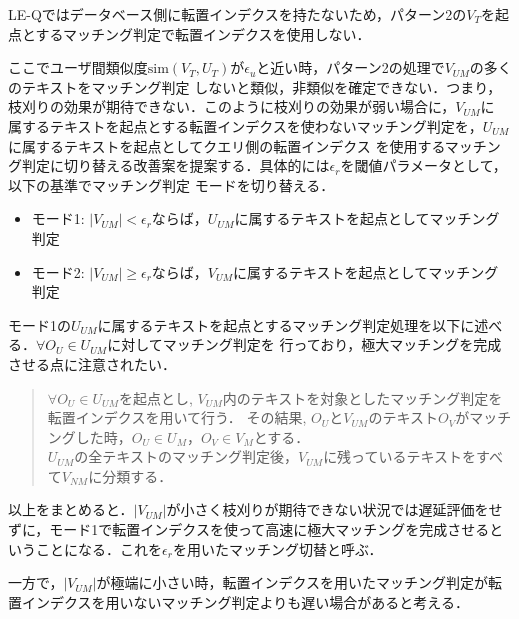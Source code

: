 LE-Qではデータベース側に転置インデクスを持たないため，パターン2の$V_T$を起点とするマッチング判定で転置インデクスを使用しない．

ここでユーザ間類似度$\mbox{sim}(V_T,U_T)$が$\epsilon_u$と近い時，パターン2の処理で$V_{UM}$の多くのテキストをマッチング判定
しないと類似，非類似を確定できない．つまり，枝刈りの効果が期待できない．このように枝刈りの効果が弱い場合に，$V_{UM}$に
属するテキストを起点とする転置インデクスを使わないマッチング判定を，$U_{UM}$に属するテキストを起点としてクエリ側の転置インデクス
を使用するマッチング判定に切り替える改善案を提案する．具体的には$\epsilon_r$を閾値パラメータとして，以下の基準でマッチング判定
モードを切り替える．
\begin{itemize}
\item モード1: $|V_{UM}|< \epsilon_r$ならば，$U_{UM}$に属するテキストを起点としてマッチング判定
\item モード2: $|V_{UM}|\ge \epsilon_r$ならば，$V_{UM}$に属するテキストを起点としてマッチング判定
\end{itemize}

モード1の$U_{UM}$に属するテキストを起点とするマッチング判定処理を以下に述べる．$\forall O_U \in U_{UM}$に対してマッチング判定を
行っており，極大マッチングを完成させる点に注意されたい．
\begin{quote}
 $\forall O_U \in U_{UM}$を起点とし, $V_{UM}$内のテキストを対象としたマッチング判定を転置インデクスを用いて行う．
その結果, $O_U$と$V_{UM}$のテキスト$O_V$がマッチングした時，$O_U \in U_M，O_V \in V_M$とする．\\
 $U_{UM}$の全テキストのマッチング判定後，$V_{UM}$に残っているテキストをすべて$V_{NM}$に分類する．
\end{quote}

以上をまとめると．$|V_{UM}|$が小さく枝刈りが期待できない状況では遅延評価をせずに，モード1で転置インデクスを使って高速に極大マッチングを完成させるということになる．これを$\epsilon_r$を用いたマッチング切替と呼ぶ．

一方で，$|V_{UM}|$が極端に小さい時，転置インデクスを用いたマッチング判定が転置インデクスを用いないマッチング判定よりも遅い場合があると考える．

